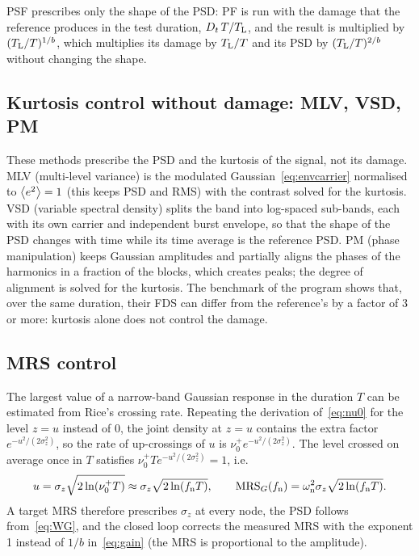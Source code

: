 PSF prescribes only the shape of the PSD: PF is run with the damage that the reference produces in
the test duration, $D_t\,T/T_{\mathrm{L}}$, and the result is multiplied by $(T_{\mathrm{L}}/T)^{1/b}$, which multiplies
its damage by $T_{\mathrm{L}}/T$ and its PSD by $(T_{\mathrm{L}}/T)^{2/b}$ without changing the shape.

\subsection{Kurtosis control without damage: MLV, VSD, PM}

These methods prescribe the PSD and the kurtosis of the signal, not its damage. MLV
(multi-level variance) is the modulated Gaussian~\eqref{eq:envcarrier} normalised to $\left\langle e^2 \right\rangle=1$
(this keeps PSD and RMS) with the contrast solved for the kurtosis. VSD (variable spectral density)
splits the band into log-spaced sub-bands, each with its own carrier and independent burst envelope,
so that the shape of the PSD changes with time while its time average is the reference PSD. PM
(phase manipulation) keeps Gaussian amplitudes and partially aligns the phases of the harmonics in a
fraction of the blocks, which creates peaks; the degree of alignment is solved for the kurtosis. The
benchmark of the program shows that, over the same duration, their FDS can differ from the
reference's by a factor of 3 or more: kurtosis alone does not control the damage.

\subsection{MRS control}

The largest value of a narrow-band Gaussian response in the duration $T$ can be estimated from Rice's
crossing rate. Repeating the derivation of~\eqref{eq:nu0} for the level $z=u$ instead of 0, the
joint density at $z=u$ contains the extra factor $e^{-u^2/(2\sigma_z^2)}$, so the rate of up-crossings
of $u$ is $\nu_0^+e^{-u^2/(2\sigma_z^2)}$. The level crossed on average once in $T$ satisfies
$\nu_0^+Te^{-u^2/(2\sigma_z^2)} = 1$, i.e.
\begin{equation}
  u = \sigma_z\sqrt{2\ln(\nu_0^+T)} \approx \sigma_z\sqrt{2\ln(f_{\mathrm{n}} T)} ,
  \qquad \mathrm{MRS}_G(f_{\mathrm{n}}) = \omega_{\mathrm{n}}^2\sigma_z\sqrt{2\ln(f_{\mathrm{n}} T)} .
\end{equation}
A target MRS therefore prescribes $\sigma_z$ at every node, the PSD follows from~\eqref{eq:WG}, and
the closed loop corrects the measured MRS with the exponent 1 instead of $1/b$ in~\eqref{eq:gain}
(the MRS is proportional to the amplitude).

